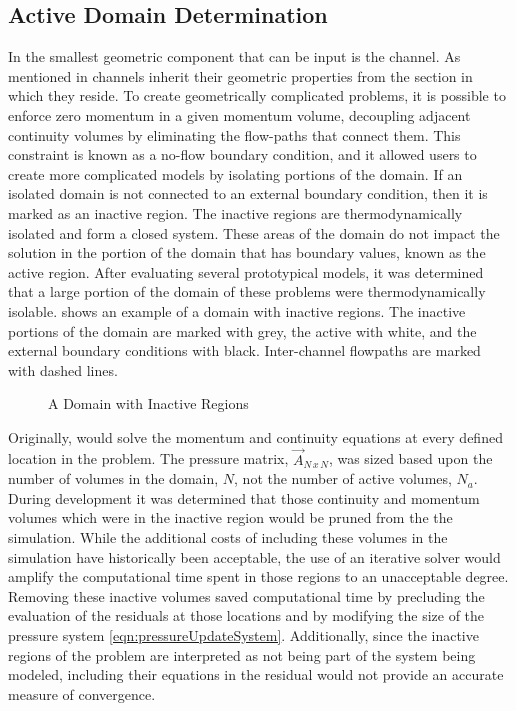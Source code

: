 \subsection{Active Domain Determination}
\label{subsect:activeDomainDetermination}
In \cobra{} the smallest geometric component that can be input is the channel.
As mentioned in  channels inherit their geometric properties from the section in which they reside.
To create geometrically complicated problems, it is possible to enforce zero momentum in a given momentum volume, decoupling adjacent continuity volumes by eliminating the flow-paths that connect them.
This constraint is known as a no-flow boundary condition, and it allowed users to create more complicated models by isolating portions of the domain.
If an isolated domain is not connected to an external boundary condition, then it is marked as an inactive region.
The inactive regions are thermodynamically isolated and form a closed system.
These areas of the domain do not impact the solution in the portion of the domain that has boundary values, known as the active region.
After evaluating several prototypical models, it was determined that a large portion of the domain of these problems were thermodynamically isolable.
 shows an example of a domain with inactive regions.
The inactive portions of the domain are marked with grey, the active with white, and the external boundary conditions with black.
Inter-channel flowpaths are marked with dashed lines.

\begin{figure}[ht!]
\centering

\caption{A Domain with Inactive Regions}
\label{fig:activeDomain}
\end{figure}

Originally, \cobra{} would solve the momentum and continuity equations at every defined location in the problem.
The pressure matrix, $\vec{A}_{N\,x\,N}$, was sized based upon the number of volumes in the domain, $N$, not the number of active volumes, $N_{a}$.
During development it was determined that those continuity and momentum volumes which were in the inactive region would be pruned from the the simulation.
While the additional costs of including these volumes in the simulation have historically been acceptable, the use of an iterative solver would amplify the computational time spent in those regions to an unacceptable degree.
Removing these inactive volumes saved computational time by precluding the evaluation of the residuals at those locations and by modifying the size of the pressure system \eqref{eqn:pressureUpdateSystem}.
Additionally, since the inactive regions of the problem are interpreted as not being part of the system being modeled, including their equations in the residual would not provide an accurate measure of convergence.

